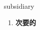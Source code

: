 
\begin{frame}
{\huge subsidiary}
\begin{center}
\begin{enumerate}\Large
  \item \textbf{次要的}
\end{enumerate}
\end{center}
\end{frame}
